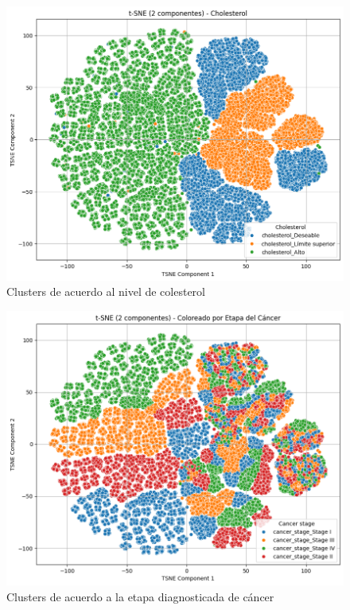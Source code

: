 \documentclass[10pt,journal,compsoc]{IEEEtran}
\begin{document}
\begin{figure}[htb]
    \centering
    \includegraphics[width=\linewidth]{imagenes/cholesterol.png}
    \caption{Clusters de acuerdo al nivel de colesterol}
    \label{fig:tsne_cholesterol}
\end{figure}

\begin{figure}[htb]
    \centering
    \includegraphics[width=\linewidth]{imagenes/cancer_stage.png}
    \caption{Clusters de acuerdo a la etapa diagnosticada de cáncer}
    \label{fig:tsne_cancer_stage}
\end{figure}
\end{document}
